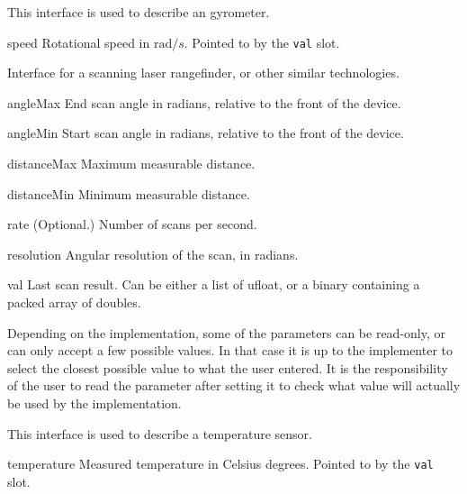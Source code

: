 This interface is used to describe an gyrometer.

\begin{urbiscriptapi}
\item[speed] Rotational speed in $\mathrm{rad}/s$.  Pointed to by the
  \lstinline{val} slot.
\end{urbiscriptapi}


Interface for a scanning laser rangefinder, or other similar technologies.

\begin{urbiscriptapi}
\item[angleMax] End scan angle in radians, relative to the front of the
  device.


\item[angleMin] Start scan angle in radians, relative to the front of the
  device.


\item[distanceMax] Maximum measurable distance.


\item[distanceMin] Minimum measurable distance.


\item[rate]{} (Optional.) Number of scans per second.


\item[resolution] Angular resolution of the scan, in radians.


\item[val] Last scan result. Can be either a list of ufloat, or a binary
  containing a packed array of doubles.
\end{urbiscriptapi}

Depending on the implementation, some of the parameters can be read-only, or
can only accept a few possible values. In that case it is up to the implementer
to select the closest possible value to what the user entered. It is the
responsibility of the user to read the parameter after setting it to check
what value will actually be used by the implementation.


This interface is used to describe a temperature sensor.

\begin{urbiscriptapi}
\item[temperature] Measured temperature in Celsius degrees.  Pointed to by
  the \lstinline{val} slot.
\end{urbiscriptapi}


